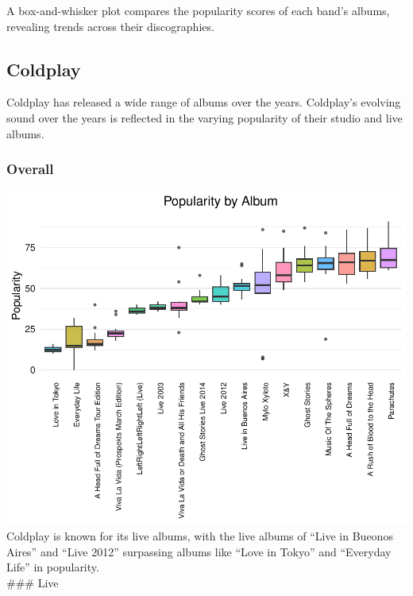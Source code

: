 \documentclass[11pt,preprint]{elsarticle}
\numberwithin{equation}{section}
\numberwithin{figure}{section}
\numberwithin{table}{section}
\begin{document}
A box-and-whisker plot compares the popularity scores of each band's
albums, revealing trends across their discographies.

\subsection{Coldplay}\label{coldplay}

Coldplay has released a wide range of albums over the years. Coldplay's
evolving sound over the years is reflected in the varying popularity of
their studio and live albums.

\subsubsection{Overall}\label{overall}

\includegraphics{Question2_files/figure-latex/unnamed-chunk-1-1.pdf}
Coldplay is known for its live albums, with the live albums of ``Live in
Bueonos Aires'' and ``Live 2012'' surpassing albums like ``Love in
Tokyo'' and ``Everyday Life'' in popularity.\\
\#\#\# Live
\end{document}
